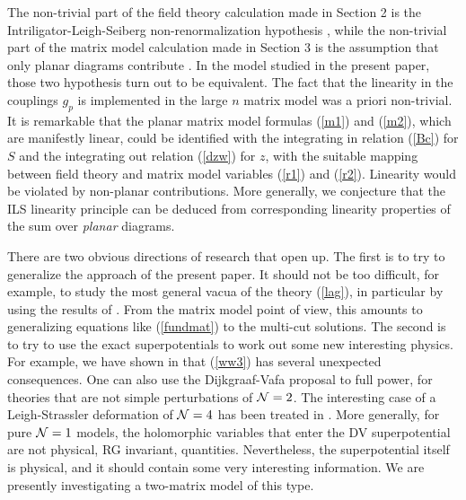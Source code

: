 \documentclass[a4paper,12pt]{article}
\begin{document}
The non-trivial part of the field theory calculation made in Section 2
is the Intriligator-Leigh-Seiberg non-renormalization hypothesis
\cite{ILS}, while the non-trivial part of the matrix model calculation
made in Section 3 is the assumption that only planar diagrams
contribute \cite{DV}. In the model studied in the present paper, those
two hypothesis turn out to be equivalent. The fact that the linearity
in the couplings $g_{p}$ is implemented in the large $n$ matrix model
was a priori non-trivial. It is remarkable that the planar matrix
model formulas (\ref{m1}) and (\ref{m2}), which are manifestly linear,
could be identified with the integrating in relation (\ref{Bc}) for
$S$ and the integrating out relation (\ref{dzw}) for $z$, with the
suitable mapping between field theory and matrix model variables
(\ref{r1}) and (\ref{r2}). Linearity would be violated by
non-planar contributions. More generally, we conjecture that
the ILS linearity principle can be deduced from corresponding
linearity properties of the sum over {\it planar} diagrams.

There are two obvious directions of research that open up. The first 
is to try to generalize the approach of the present paper. It should 
not be too difficult, for example, to study the most general vacua of 
the theory (\ref{lag}), in particular by using the results of \cite{CV}. 
From the matrix model point of view, this amounts to generalizing 
equations like (\ref{fundmat}) to the multi-cut solutions. The second
is to try to use the exact superpotentials to work out some new 
interesting physics. For example, we have shown in \cite{fer} that
(\ref{ww3}) has several unexpected consequences. One can also use
the Dijkgraaf-Vafa proposal to full power, for theories that are not 
simple perturbations of ${\cal N}=2$. The interesting case of a 
Leigh-Strassler deformation of ${\cal N}=4$ has been treated in 
\cite{DH}. More generally, for pure ${\cal N}=1$ models,
the holomorphic variables that enter 
the DV superpotential are not physical, RG invariant, 
quantities. Nevertheless, the superpotential itself is physical, and 
it should contain some very interesting information. We are
presently investigating a two-matrix model \cite{2M} of this type.
\end{document}
